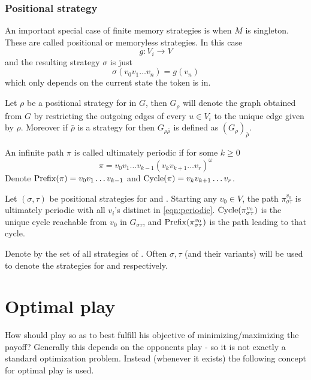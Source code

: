 \subsubsection{Positional strategy}
An important special case of finite memory strategies is when $M$ is singleton. These are called positional or memoryless strategies. In this case
\[
    g : V_i \to V
\]
and the resulting strategy $\sigma$ is just
\[
    \sigma( v_0 v_1 \ldots v_n ) = g(v_n)
\]
which only depends on the current state the token is in.

Let $\rho$ be a positional strategy for  in $G$, then $G_{\rho}$ will denote the graph obtained from $G$ by restricting the outgoing edges of every $u\in V_i$ to the unique edge given by $\rho$. Moreover if $\bar{\rho}$ is a strategy for  then $G_{\rho\bar{\rho}}$ is defined as $(G_\rho)_{\bar{\rho}}$.

An infinite path $\pi$ is called ultimately periodic if for some $k \geq 0$
\begin{equation}
    \pi = v_0 v_1 \ldots v_{k-1} (v_k v_{k+1} \ldots v_r)^\omega \label{eqn:periodic}
\end{equation}
Denote $\operatorname{Prefix}(\pi)=v_0 v_1 \ldots v_{k-1}$ and $\operatorname{Cycle}(\pi)=v_k v_{k+1} \ldots v_r$.

Let $(\sigma,\tau)$ be positional strategies for  and . Starting any $v_0 \in V$, the path $\pi^{v_0}_{\sigma\tau}$ is ultimately periodic with all $v_i$'s distinct in \eqref{eqn:periodic}.  $\operatorname{Cycle}(\pi^{v_0}_{\sigma\tau})$ is the unique cycle reachable from $v_0$ in $G_{\sigma\tau}$, and $\operatorname{Prefix}(\pi^{v_0}_{\sigma\tau})$ is the path leading to that cycle.

Denote by  the set of all strategies of . Often $\sigma,\tau$ (and their variants) will be used to denote the strategies for  and  respectively. 


\section{Optimal play}
How should  play so as to best fulfill his objective of minimizing/maximizing the payoff? Generally this depends on the opponents play - so it is not exactly a standard optimization problem. Instead (whenever it exists) the following concept for optimal play is used.
